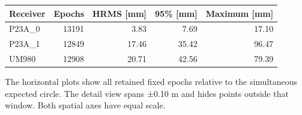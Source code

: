 \documentclass[11pt,a4paper]{article}
\numberwithin{equation}{section}
\numberwithin{figure}{section}
\begin{document}
\begin{center}\begin{lrbox}{\reporttable}\small\setlength{\tabcolsep}{4pt}\begin{tabular}{lrrrr}\toprule
Receiver & Epochs & HRMS [mm] & 95\% [mm] & Maximum [mm]\\\midrule
P23A\_0 & 13191 & 3.83 & 7.69 & 17.10\\
P23A\_1 & 12849 & 17.46 & 35.42 & 96.47\\
UM980 & 12908 & 20.71 & 42.56 & 79.39\\
\bottomrule\end{tabular}\end{lrbox}\ifdim\wd\reporttable>\linewidth\resizebox{\linewidth}{!}{\usebox{\reporttable}}\else\usebox{\reporttable}\fi\end{center}

The horizontal plots show all retained fixed epochs relative to the simultaneous expected circle. The detail view spans ±0.10 m and hides points outside that window. Both spatial axes have equal scale.
\end{document}
